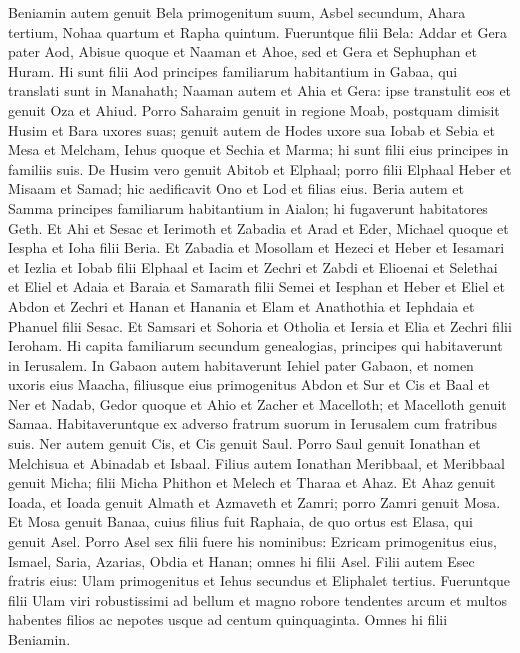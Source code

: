 \begin{biblechapter}
\begin{biblechapter}
\begin{biblechapter}
\begin{biblechapter}
\begin{biblechapter}
\begin{biblechapter}
\begin{biblechapter}
\begin{biblechapter}
\verse Beniamin autem genuit Bela primogenitum suum, Asbel secundum, Ahara tertium, 
\verse Nohaa quartum et Rapha quintum. 
\verse Fueruntque filii Bela: Addar et Gera pater Aod, 
\verse Abisue quoque et Naaman et Ahoe, 
\verse sed et Gera et Sephuphan et Huram. 
\verse Hi sunt filii Aod principes familiarum habitantium in Gabaa, qui translati sunt in Manahath; 
\verse Naaman autem et Ahia et Gera: ipse transtulit eos et genuit Oza et Ahiud. 
\verse Porro Saharaim genuit in regione Moab, postquam dimisit Husim et Bara uxores suas; 
\verse genuit autem de Hodes uxore sua Iobab et Sebia et Mesa et Melcham, 
\verse Iehus quoque et Sechia et Marma; hi sunt filii eius principes in familiis suis. 
\verse De Husim vero genuit Abitob et Elphaal; 
\verse porro filii Elphaal Heber et Misaam et Samad; hic aedificavit Ono et Lod et filias eius.
 \verse Beria autem et Samma principes familiarum habitantium in Aialon; hi fugaverunt habitatores Geth. 
\verse Et Ahi et Sesac et Ierimoth 
\verse et Zabadia et Arad et Eder, 
\verse Michael quoque et Iespha et Ioha filii Beria. 
 \verse Et Zabadia et Mosollam et Hezeci et Heber 
\verse et Iesamari et Iezlia et Iobab filii Elphaal 
\verse et Iacim et Zechri et Zabdi 
\verse et Elioenai et Selethai et Eliel 
\verse et Adaia et Baraia et Samarath filii Semei 
\verse et Iesphan et Heber et Eliel 
\verse et Abdon et Zechri et Hanan 
\verse et Hanania et Elam et Anathothia 
\verse et Iephdaia et Phanuel filii Sesac. 
\verse Et Samsari et Sohoria et Otholia 
\verse et Iersia et Elia et Zechri filii Ieroham.
 \verse Hi capita familiarum secundum genealogias, principes qui habitaverunt in Ierusalem.
 \verse In Gabaon autem habitaverunt Iehiel pater Gabaon, et nomen uxoris eius Maacha, 
\verse filiusque eius primogenitus Abdon et Sur et Cis et Baal et Ner et Nadab, 
\verse Gedor quoque et Ahio et Zacher et Macelloth; 
\verse et Macelloth genuit Samaa. Habitaveruntque ex adverso fratrum suorum in Ierusalem cum fratribus suis.
 \verse Ner autem genuit Cis, et Cis genuit Saul. Porro Saul genuit Ionathan et Melchisua et Abinadab et Isbaal. 
\verse Filius autem Ionathan Meribbaal, et Meribbaal genuit Micha; 
\verse filii Micha Phithon et Melech et Tharaa et Ahaz. 
 \verse Et Ahaz genuit Ioada, et Ioada genuit Almath et Azmaveth et Zamri; porro Zamri genuit Mosa. 
\verse Et Mosa genuit Banaa, cuius filius fuit Raphaia, de quo ortus est Elasa, qui genuit Asel. 
\verse Porro Asel sex filii fuere his nominibus: Ezricam primogenitus eius, Ismael, Saria, Azarias, Obdia et Hanan; omnes hi filii Asel. 
\verse Filii autem Esec fratris eius: Ulam primogenitus et Iehus secundus et Eliphalet tertius. 
\verse Fueruntque filii Ulam viri robustissimi ad bellum et magno robore tendentes arcum et multos habentes filios ac nepotes usque ad centum quinquaginta. Omnes hi filii Beniamin.
 

\end{biblechapter}
\end{biblechapter}
\end{biblechapter}
\end{biblechapter}
\end{biblechapter}
\end{biblechapter}
\end{biblechapter}
\end{biblechapter}

